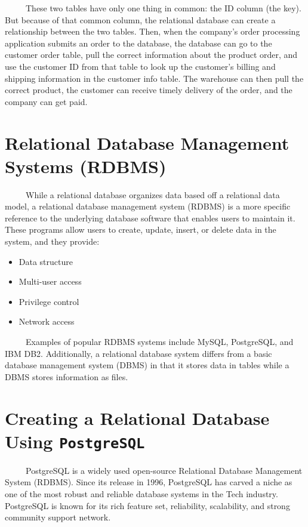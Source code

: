 \documentclass[
  letterpaper,
  DIV=11,
  numbers=noendperiod]{scrreprt}
\providecommand{\tightlist}{%
  \setlength{\itemsep}{0pt}\setlength{\parskip}{0pt}}
\begin{document}
~~~~~These two tables have only one thing in common: the ID column (the
key). But because of that common column, the relational database can
create a relationship between the two tables. Then, when the company's
order processing application submits an order to the database, the
database can go to the customer order table, pull the correct
information about the product order, and use the customer ID from that
table to look up the customer's billing and shipping information in the
customer info table. The warehouse can then pull the correct product,
the customer can receive timely delivery of the order, and the company
can get paid.

\section{Relational Database Management Systems
(RDBMS)}\label{relational-database-management-systems-rdbms}

~~~~~While a relational database organizes data based off a relational
data model, a relational database management system (RDBMS) is a more
specific reference to the underlying database software that enables
users to maintain it. These programs allow users to create, update,
insert, or delete data in the system, and they provide:

\begin{itemize}
\tightlist
\item
  Data structure
\item
  Multi-user access
\item
  Privilege control
\item
  Network access
\end{itemize}

~~~~~Examples of popular RDBMS systems include MySQL, PostgreSQL, and
IBM DB2. Additionally, a relational database system differs from a basic
database management system (DBMS) in that it stores data in tables while
a DBMS stores information as files.

\section{\texorpdfstring{Creating a Relational Database Using
\texttt{PostgreSQL}}{Creating a Relational Database Using PostgreSQL}}\label{creating-a-relational-database-using-postgresql}

~~~~~PostgreSQL is a widely used open-source Relational Database
Management System (RDBMS). Since its release in 1996, PostgreSQL has
carved a niche as one of the most robust and reliable database systems
in the Tech industry. PostgreSQL is known for its rich feature set,
reliability, scalability, and strong community support network.
\end{document}
